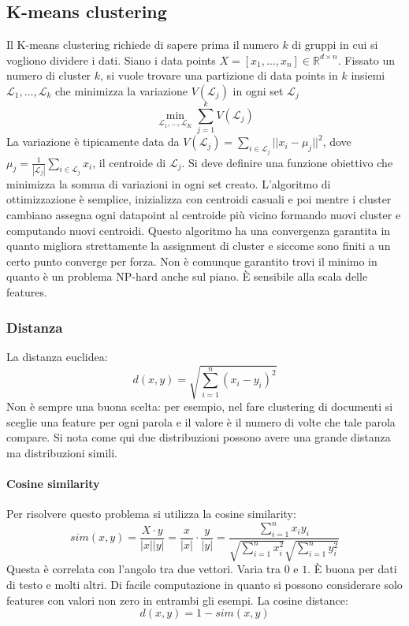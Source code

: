 	\subsection{K-means clustering}
	Il K-means clustering richiede di sapere prima il numero $k$ di gruppi in cui si vogliono dividere i dati.
	Siano i data points $X=[x_1,\dots,x_n]\in\mathbb{R}^{d\times n}$.
	Fissato un numero di cluster $k$, si vuole trovare una partizione di data points in $k$ insiemi $\mathcal{L}_1,\dots,\mathcal{L}_k$ che minimizza la variazione $V(\mathcal{L}_j)$ in ogni set $\mathcal{L}_j$
	$$\min\limits_{\mathcal{L}_1,\dots,\mathcal{L}_K}\sum\limits_{j = 1}^kV(\mathcal{L}_j)$$
	La variazione \`e tipicamente data da $V(\mathcal{L}_j) = \sum\limits_{i\in\mathcal{L}_j}||x_i-\mu_j||^2$, dove $\mu_j = \frac{1}{|\mathcal{L}_j|}\sum\limits_{i\in\mathcal{L}_j}x_i$, il centroide di $\mathcal{L}_j$.
	Si deve definire una funzione obiettivo che minimizza la somma di variazioni in ogni set creato.
	L'algoritmo di ottimizzazione \`e semplice, inizializza con centroidi casuali e poi mentre i cluster cambiano assegna ogni datapoint al centroide pi\`u vicino formando nuovi cluster e computando nuovi centroidi.
	Questo algoritmo ha una convergenza garantita in quanto migliora strettamente la assignment di cluster e siccome sono finiti a un certo punto converge per forza.
	Non \`e comunque garantito trovi il minimo in quanto \`e un problema NP-hard anche sul piano.
	\`E sensibile alla scala delle features.

		\subsubsection{Distanza}
		La distanza euclidea:
		$$d(x,y) = \sqrt{\sum\limits_{i=1}^n(x_i-y_i)^2}$$
		Non \`e sempre una buona scelta: per esempio, nel fare clustering di documenti si sceglie una feature per ogni parola e il valore \`e il numero di volte che tale parola compare.
		Si nota come qui due distribuzioni possono avere una grande distanza ma distribuzioni simili.

			\paragraph{Cosine similarity}
			Per risolvere questo problema si utilizza la cosine similarity:
			$$sim(x,y) = \frac{X\cdot y}{|x||y|} = \frac{x}{|x|}\cdot\frac{y}{|y|} = \frac{\sum\limits_{i = 1}^n x_iy_i}{\sqrt{\sum\limits_{i = 1}^n x_i^2}\sqrt{\sum\limits_{i = 1}^ny_i^2}}$$
			Questa \`e correlata con l'angolo tra due vettori.
			Varia tra $0$ e $1$.
			\`E buona per dati di testo e molti altri.
			Di facile computazione in quanto si possono considerare solo features con valori non zero in entrambi gli esempi.
			La cosine distance:
			$$d(x,y) = 1-sim(x,y)$$


